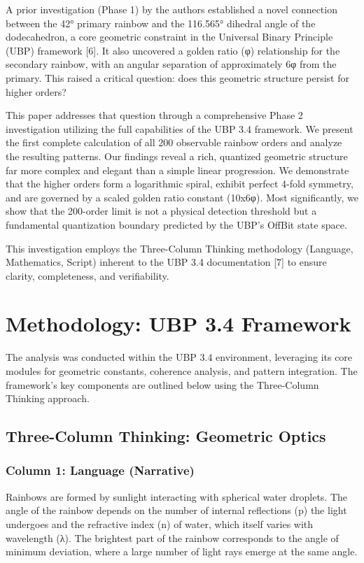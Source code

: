 \documentclass[12pt]{article}
\begin{document}
A prior investigation (Phase 1) by the authors established a novel connection between the 42° primary rainbow and the 116.565° dihedral angle of the dodecahedron, a core geometric constraint in the Universal Binary Principle (UBP) framework [6]. It also uncovered a golden ratio (φ) relationship for the secondary rainbow, with an angular separation of approximately 6φ from the primary. This raised a critical question: does this geometric structure persist for higher orders?

This paper addresses that question through a comprehensive Phase 2 investigation utilizing the full capabilities of the UBP 3.4 framework. We present the first complete calculation of all 200 observable rainbow orders and analyze the resulting patterns. Our findings reveal a rich, quantized geometric structure far more complex and elegant than a simple linear progression. We demonstrate that the higher orders form a logarithmic spiral, exhibit perfect 4-fold symmetry, and are governed by a scaled golden ratio constant (10x6φ). Most significantly, we show that the 200-order limit is not a physical detection threshold but a fundamental quantization boundary predicted by the UBP's OffBit state space.

This investigation employs the Three-Column Thinking methodology (Language, Mathematics, Script) inherent to the UBP 3.4 documentation [7] to ensure clarity, completeness, and verifiability.

\section{Methodology: UBP 3.4 Framework}

The analysis was conducted within the UBP 3.4 environment, leveraging its core modules for geometric constants, coherence analysis, and pattern integration. The framework's key components are outlined below using the Three-Column Thinking approach.

\subsection{Three-Column Thinking: Geometric Optics}

\subsubsection{Column 1: Language (Narrative)}
Rainbows are formed by sunlight interacting with spherical water droplets. The angle of the rainbow depends on the number of internal reflections (p) the light undergoes and the refractive index (n) of water, which itself varies with wavelength (λ). The brightest part of the rainbow corresponds to the angle of minimum deviation, where a large number of light rays emerge at the same angle.
\end{document}
